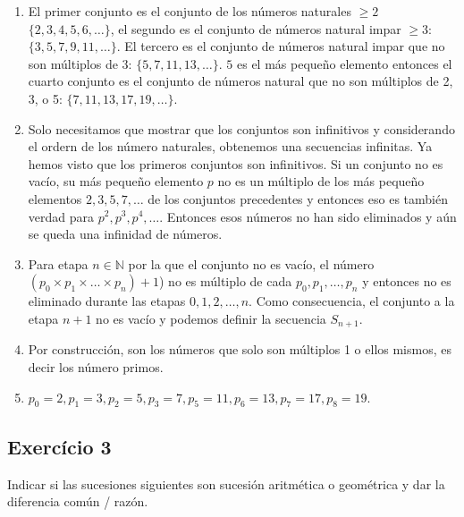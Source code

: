 \begin{enumerate}
\item El primer conjunto es el conjunto de los números naturales $\geq 2$
  $\{ 2, 3, 4, 5, 6, \ldots \}$, el segundo
  es el conjunto de números natural impar $\geq 3$: $\{ 3, 5, 7, 9, 11, \ldots \}$.
  El tercero es el conjunto de números natural impar que no son múltiplos de
  3: $\{ 5, 7, 11, 13, \ldots \}$. $5$ es el más pequeño elemento entonces
  el cuarto conjunto es el conjunto de números natural que no son múltiplos de
  2, 3, o 5: $\{ 7, 11, 13, 17, 19, \ldots \}$.
\item Solo necesitamos que mostrar que los conjuntos son infinitivos y
  considerando el ordern de los número naturales, obtenemos una secuencias
  infinitas. Ya hemos visto que los primeros conjuntos son infinitivos.
  Si un conjunto no es vacío, su más pequeño elemento $p$ no es un múltiplo
  de los más pequeño elementos $2, 3, 5, 7, \ldots$ de los conjuntos precedentes y
  entonces eso es también verdad para $p^2, p^3, p^4, \ldots$. Entonces esos
  números no han sido eliminados y aún se queda una infinidad de números.
\item Para etapa $n \in \mathbb N$ por la que el conjunto no es vacío,
  el número $\left(p_0 \times p_1 \times \ldots \times p_n\right) + 1$)
  no es múltiplo de cada $p_0, p_1, \ldots, p_n$ y entonces no es eliminado durante
  las etapas $0, 1, 2, \ldots, n$. Como consecuencia, el conjunto a la etapa
  $n+1$ no es vacío y podemos definir la secuencia $S_{n+1}$.
\item Por construcción, son los números que solo son múltiplos 1 o ellos mismos,
  es decir los número primos.
\item $p_0=2, p_1=3, p_2=5, p_3=7, p_5=11, p_6=13, p_7=17, p_8=19$.
\end{enumerate}

\subsection*{Exercício 3}

Indicar si las sucesiones siguientes son sucesión aritmética o geométrica y
dar la diferencia común / razón.

